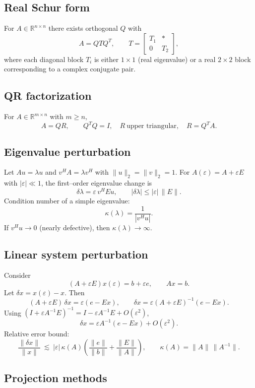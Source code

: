\subsection{Real Schur form}
For \(A\in\mathbb{R}^{n\times n}\) there exists orthogonal \(Q\) with
\[
A=QTQ^T,\qquad
T=\begin{bmatrix}T_1&*\\0&T_2\end{bmatrix},
\]
where each diagonal block \(T_i\) is either \(1\times1\) (real eigenvalue) or a real \(2\times2\) block corresponding to a complex conjugate pair.

\subsection{QR factorization}

For \(A\in\mathbb{R}^{m\times n}\) with \(m\ge n\),
\[
A=QR,\qquad Q^TQ=I,\quad R\ \text{upper triangular},\quad R=Q^TA.
\]

\subsection{Eigenvalue perturbation}
Let \(Au=\lambda u\) and \(v^HA=\lambda v^H\) with \(\|u\|_2=\|v\|_2=1\). For \(A(\varepsilon)=A+\varepsilon E\) with \(|\varepsilon|\ll1\), the first–order eigenvalue change is
\[
\delta\lambda=\varepsilon\,v^HEu,\qquad
|\delta\lambda|\le|\varepsilon|\,\|E\|.
\]
Condition number of a simple eigenvalue:
\[
\kappa(\lambda)=\frac{1}{|v^Hu|}.
\]
If \(v^Hu\to0\) (nearly defective), then \(\kappa(\lambda)\to\infty\).

\subsection{Linear system perturbation}

Consider
\[
(A+\varepsilon E)x(\varepsilon)=b+\varepsilon e,\qquad Ax=b.
\]
Let \(\delta x=x(\varepsilon)-x\). Then
\[
(A+\varepsilon E)\,\delta x=\varepsilon(e-Ex),
\qquad
\delta x=\varepsilon(A+\varepsilon E)^{-1}(e-Ex).
\]
Using \((I+\varepsilon A^{-1}E)^{-1}=I-\varepsilon A^{-1}E+O(\varepsilon^2)\),
\[
\delta x=\varepsilon A^{-1}(e-Ex)+O(\varepsilon^2).
\]
Relative error bound:
\[
\frac{\|\delta x\|}{\|x\|}\ \lesssim\ |\varepsilon|\,\kappa(A)\!
\left(\frac{\|e\|}{\|b\|}+\frac{\|E\|}{\|A\|}\right),
\qquad
\kappa(A)=\|A\|\,\|A^{-1}\|.
\]

\subsection{Projection methods}

